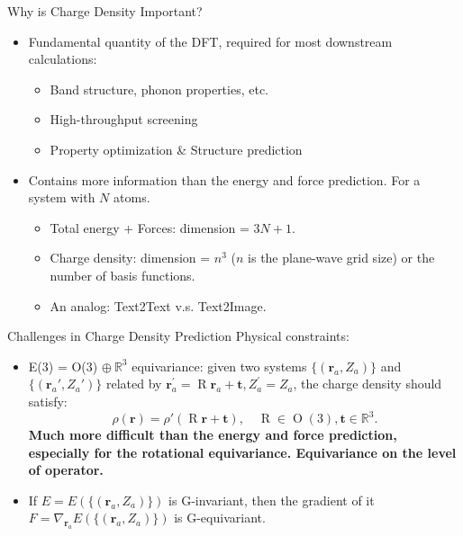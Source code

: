 \begin{frame}{Why is Charge Density Important?}
    \begin{itemize}
        \item Fundamental quantity of the DFT, required for
        most downstream calculations:
            \begin{itemize}
                \item Band structure, phonon properties, etc.
                \item High-throughput screening
                \item Property optimization \& Structure prediction
            \end{itemize}
        \item Contains more information than the energy and force prediction. For a system
        with $N$ atoms.
        \begin{itemize}
            \item Total energy + Forces: dimension = $3N + 1$.
            \item Charge density: dimension = $n^3$ ($n$ is the plane-wave grid size) or
            the number of basis functions.
            \item An analog: Text2Text v.s. Text2Image.
        \end{itemize}
    \end{itemize}
\end{frame}

\begin{frame}{Challenges in Charge Density Prediction}
    Physical constraints:
    \begin{itemize}
        \item E(3) = O(3) $\oplus \ \mathbb{R}^3$ equivariance: given two systems $\{(\mathbf{r}_a, Z_a)\}$ and
        $\{(\mathbf{r}_a', Z_a')\}$
        related by $\mathbf{r}_a^{\prime} = \operatorname{R}\mathbf{r}_a + \mathbf{t}, Z_a^{\prime} = Z_a$, the
        charge density should satisfy:
        \begin{equation*}
            \rho(\mathbf{r}) = \rho'(\operatorname{R}\mathbf{r} + \mathbf{t}), \quad
            \operatorname{R} \in \operatorname{O}(3), \mathbf{t} \in \mathbb{R}^3.
        \end{equation*}
        {\color{red}\textbf{Much more difficult than the energy and force prediction,
        especially for the rotational equivariance. Equivariance on the level of operator.}}
        \item If $E = E(\{(\mathbf{r}_a, Z_a)\})$ is G-invariant, then the gradient
        of it $F = \nabla_{\mathbf{r}_a}E(\{(\mathbf{r}_a, Z_a)\})$ is G-equivariant.
    \end{itemize}
\end{frame}

